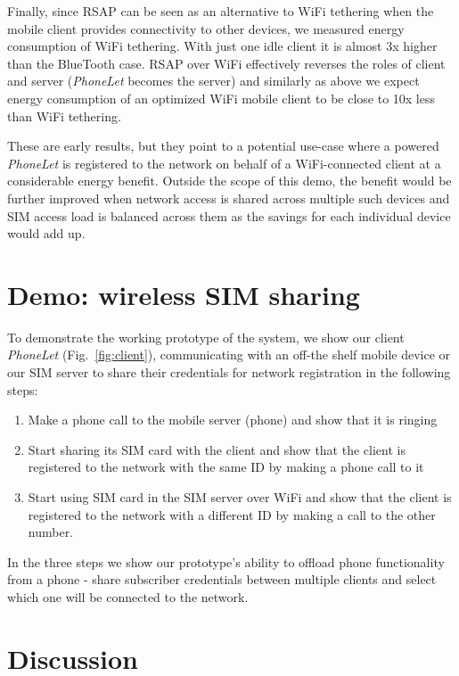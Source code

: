 \documentclass{sig-alternate-10pt}
\begin{document}
Finally, since RSAP can be seen as an alternative to WiFi tethering when the mobile client provides connectivity to other devices, we measured energy consumption of WiFi tethering. With just one idle client it is almost 3x higher than the BlueTooth case. RSAP over WiFi effectively reverses the roles of client and server (\emph{PhoneLet} becomes the server) and similarly as above we expect energy consumption of an optimized WiFi mobile client to be close to 10x less than WiFi tethering. 

These are early results, but they point to a potential use-case where a powered \emph{PhoneLet} is registered to the network on behalf of a WiFi-connected client at a considerable energy benefit. Outside the scope of this demo, the benefit would be further improved when network access is shared across multiple such devices and SIM access load is balanced across them as the savings for each individual device would add up.

\section{Demo: wireless SIM sharing}

To demonstrate the working prototype of the system, we show our client \emph{PhoneLet} (Fig.~\ref{fig:client}), communicating with an off-the shelf mobile device or our SIM server to share their credentials for network registration in the following steps:

\begin{enumerate}
    \item Make a phone call to the mobile server (phone) and show that it is ringing
    \item Start sharing its SIM card with the client and show that the client is registered to the network with the same ID by making a phone call to it
    \item Start using SIM card in the SIM server over WiFi and show that the client is registered to the network with a different ID by making a call to the other number.
\end{enumerate}

In the three steps we show our prototype's ability to offload phone functionality from a phone - share subscriber credentials between multiple clients and select which one will be connected to the network.

\section{Discussion}
\end{document}
